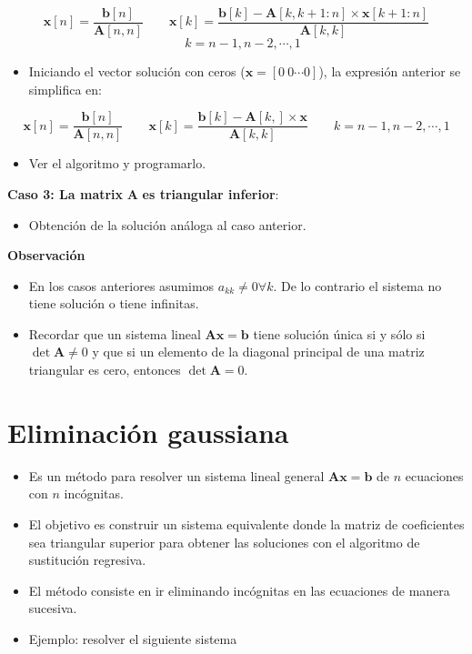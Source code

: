 \documentclass[openany]{book}
\providecommand{\tightlist}{%
  \setlength{\itemsep}{0pt}\setlength{\parskip}{0pt}}
\begin{document}
\[
\mathbf{x}[n] = \frac{\mathbf{b}[n]}{\mathbf{A}[n,n]} \qquad \mathbf{x}[k] = \frac{\mathbf{b}[k] - \mathbf{A}[k, k+1 : n] \times \mathbf{x}[k+1 : n]}{\mathbf{A}[k,k]}
\]
\[
\quad k = n-1, n-2, \cdots, 1
\]

\begin{itemize}
\tightlist
\item
  Iniciando el vector solución con ceros (\(\mathbf{x} = [0 ~ 0 \cdots 0]\)), la expresión anterior se simplifica en:
\end{itemize}

\[
\mathbf{x}[n] = \frac{\mathbf{b}[n]}{\mathbf{A}[n,n]} \qquad \mathbf{x}[k] = \frac{\mathbf{b}[k] - \mathbf{A}[k, ] \times \mathbf{x}}{\mathbf{A}[k,k]}
\qquad k = n-1, n-2, \cdots, 1
\]

\begin{itemize}
\tightlist
\item
  Ver el algoritmo y programarlo.
\end{itemize}

\textbf{Caso 3: La matrix} \(\mathbf{A}\) \textbf{es triangular inferior}:

\begin{itemize}
\tightlist
\item
  Obtención de la solución análoga al caso anterior.
\end{itemize}

\textbf{Observación}

\begin{itemize}
\tightlist
\item
  En los casos anteriores asumimos \(a_{kk} \neq 0 \forall k\). De lo contrario el sistema no tiene solución o tiene infinitas.
\item
  Recordar que un sistema lineal \(\mathbf{Ax=b}\) tiene solución única si y sólo si \(\det \mathbf{A} \neq 0\) y que si un elemento de la diagonal principal de una matriz triangular es cero, entonces \(\det \mathbf{A} = 0\).
\end{itemize}

\hypertarget{eliminaciuxf3n-gaussiana}{%
\section{Eliminación gaussiana}\label{eliminaciuxf3n-gaussiana}}

\begin{itemize}
\tightlist
\item
  Es un método para resolver un sistema lineal general \(\mathbf{Ax=b}\) de \(n\) ecuaciones con \(n\) incógnitas.
\item
  El objetivo es construir un sistema equivalente donde la matriz de coeficientes sea triangular superior para obtener las soluciones con el algoritmo de sustitución regresiva.
\item
  El método consiste en ir eliminando incógnitas en las ecuaciones de manera sucesiva.
\item
  Ejemplo: resolver el siguiente sistema
\end{itemize}
\end{document}
